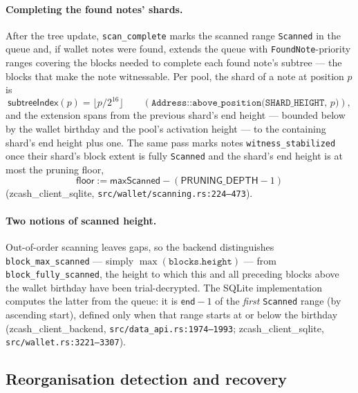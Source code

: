 \documentclass[11pt,a4paper]{article}
\theoremstyle{definition}
\begin{document}
\paragraph{Completing the found notes' shards.} After the tree update,
\texttt{scan\_complete} marks the scanned range \texttt{Scanned} in the
queue and, if wallet notes were found, extends the queue with
\texttt{FoundNote}-priority ranges covering the blocks needed to complete
each found note's subtree --- the blocks that make the note witnessable.
Per pool, the shard of a note at position $p$ is
\[
\mathsf{subtreeIndex}(p) = \lfloor p / 2^{16} \rfloor
\qquad (\texttt{Address::above\_position(SHARD\_HEIGHT, } p\texttt{)}),
\]
and the extension spans from the previous shard's end height --- bounded
below by the wallet birthday and the pool's activation height --- to the
containing shard's end height plus one. The same pass marks notes
\texttt{witness\_stabilized} once their shard's block extent is fully
\texttt{Scanned} and the shard's end height is at most the pruning floor,
\[
\mathsf{floor} := \mathsf{maxScanned} - (\mathsf{PRUNING\_DEPTH} - 1)
\]
(\textsf{zcash\_client\_sqlite}, \texttt{src/wallet/scanning.rs:224--473}).

\paragraph{Two notions of scanned height.} Out-of-order scanning leaves
gaps, so the backend distinguishes \texttt{block\_max\_scanned} --- simply
$\max(\texttt{blocks.height})$ --- from \texttt{block\_fully\_scanned}, the
height to which this and all preceding blocks above the wallet birthday
have been trial-decrypted. The SQLite implementation computes the latter
from the queue: it is $\mathsf{end} - 1$ of the \emph{first}
\texttt{Scanned} range (by ascending start), defined only when that range
starts at or below the birthday
(\textsf{zcash\_client\_backend}, \texttt{src/data\_api.rs:1974--1993};
\textsf{zcash\_client\_sqlite}, \texttt{src/wallet.rs:3221--3307}).

\subsection{Reorganisation detection and recovery}\label{sec:sync-reorg}
\end{document}
